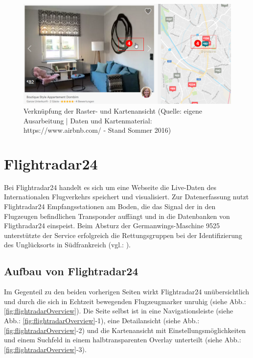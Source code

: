 \documentclass[../Bachelorarbeit.tex]{subfiles}
\begin{document}
\begin{figure}[H]
\centering
\includegraphics[width=1\linewidth]{img/StandDerTechnik/airbnbDetail}
\caption[Verknüpfung der Raster- und Kartenansicht]{Verknüpfung der Raster- und Kartenansicht (Quelle: eigene Ausarbeitung | Daten und Kartenmaterial: https://www.airbnb.com/ - Stand Sommer 2016)}
\label{fig:airbnbDetail}
\end{figure}




\section{Flightradar24}
\label{Flightradar}
Bei Flightradar24 handelt es sich um eine Webseite die Live-Daten des Internationalen Flugverkehrs speichert und visualisiert. 
Zur Datenerfassung nutzt Flightradar24 Empfangsstationen am Boden, die das Signal der in den Flugzeugen befindlichen Transponder auffängt und in die Datenbanken von Fligthradar24 einspeist. 
Beim Absturz der Germanwings-Maschine 9525 unterstützte der Service erfolgreich die Rettungsgruppen bei der Identifizierung des Unglücksorts in Südfrankreich (vgl.: \cite{SiebeckFlightradar}).


\subsection{Aufbau von Flightradar24}
\label{flightradarAufbau}
Im Gegenteil zu den beiden vorherigen Seiten wirkt Flightradar24 unübersichtlich und durch die sich in Echtzeit bewegenden Flugzeugmarker unruhig (siehe Abb.: \ref{fig:flightradarOverview}).
Die Seite selbst ist in eine Navigationsleiste (siehe Abb.: \ref{fig:flightradarOverview}-1), eine Detailansicht (siehe Abb.: \ref{fig:flightradarOverview}-2) und die Kartenansicht mit Einstellungsmöglichkeiten und einem Suchfeld in einem halbtransparenten Overlay unterteilt (siehe Abb.: \ref{fig:flightradarOverview}-3). 
\end{document}

